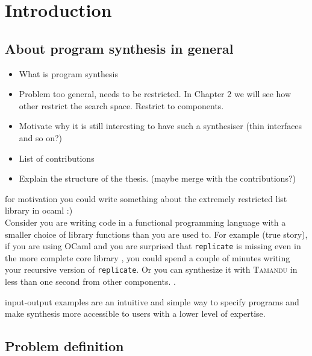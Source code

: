 \newcommand{\package}{\emph}

\chapter{Introduction}\label{ch:introduction}

\section{About program synthesis in general}

\begin{itemize}
\item What is program synthesis
\item Problem too general, needs to be restricted. In Chapter 2 we will see how other restrict the search space. Restrict to components.
\item Motivate why it is still interesting to have such a synthesiser (thin interfaces and so on?)
\item List of contributions
\item Explain the structure of the thesis. (maybe merge with the contributions?)
\end{itemize}

for motivation you could write something about the extremely restricted list library in ocaml :)\\
Consider you are writing code in a functional programming language with a smaller choice of library functions than you are used to. For example (true story), if you are using OCaml and you are surprised that \lstinline?replicate? is missing even in the more complete core library , you could spend a couple of minutes writing your recursive version of \lstinline?replicate?. Or you can synthesize it with \textsc{Tamandu} in less than one second from other components. .

input-output examples are an intuitive and simple way to specify programs and make synthesis more accessible to users with a lower level of expertise.


\section{Problem definition}
  
